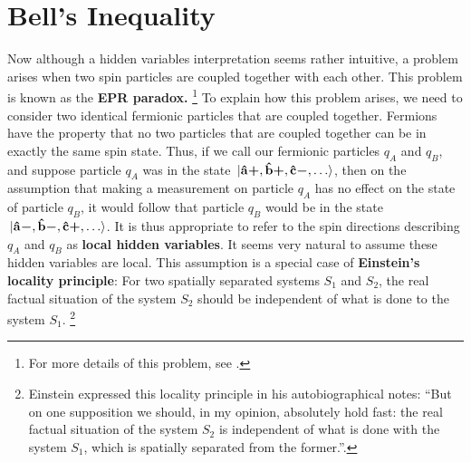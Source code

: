 \documentclass[letter, 12pt]{turabian-thesis}
\theoremstyle{hypothesis}
\newcommand{\uvb}[1]{\vb{\hat{{#1}}}}
\newcommand{\uvbp}[1]{\uvb{#1}\bm{+}}
\newcommand{\uvbm}[1]{\uvb{#1}\bm{-}}
\let\origfootnote\footnote %
\renewcommand{\footnote}[1]{%
\noindent %
\origfootnote{#1}}
\begin{document}
\section{Bell's Inequality}\label{BellSection}
Now although a hidden variables interpretation seems rather intuitive, a problem arises when two spin particles are coupled together with each other. This problem is known as the \textbf{EPR paradox.}\footnote{For more details of this problem, see \cite[241-249]{Sakurai}.} To explain how this problem arises, we need to consider two identical fermionic particles that are coupled together. Fermions have the property that no two particles that are coupled together can be in exactly the same spin state. Thus, if we call our fermionic particles $q_A$ and $q_B$, and suppose particle $q_A$ was in the state $\ket*{\uvbp{a},\uvbp{b},\uvbm{c},\ldots}$, then on the assumption that making a measurement on particle $q_A$ has no effect on the state of particle $q_B$, it would follow that particle $q_B$ would be in the  state  $\ket*{\uvbm{a},\uvbm{b},\uvbp{c},\ldots}$. It is thus appropriate to refer to the spin directions describing $q_A$ and $q_B$ as \textbf{local hidden variables}. It seems very natural to assume these  hidden variables are local. This assumption is a special case of \textbf{Einstein's locality principle}: For two spatially separated systems $S_1$ and $S_2$,  the real factual situation of the system $S_2$ should be independent of what is done to the system $S_1$.\footnote{Einstein expressed this locality principle in his autobiographical notes: ``But on one supposition we should, in my opinion, absolutely hold fast: the real factual situation of the system $S_2$ is independent of what is done with the system $S_1$, which is spatially separated from the former.''\cite[p. 85]{EinsteinLocality}.} 
 
\end{document}
